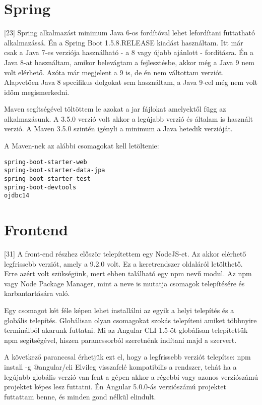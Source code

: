 




\section{Spring}

[23] Spring alkalmazást minimum Java 6-os fordítóval lehet lefordítani futtatható alkalmazássá. Én a Spring Boot 1.5.8.RELEASE kiadást használtam. Itt már csak a Java 7-es verziója használható - a 8 vagy újabb ajánlott - fordításra. Én a Java 8-at használtam, amikor belevágtam a fejlesztésbe, akkor még a Java 9 nem volt elérhető. Azóta már megjelent a 9 is, de én nem váltottam verziót. Alapvetően Java 8 specifikus dolgokat sem használtam, a Java 9-cel még nem volt időm megismerkedni.

Maven segítségével töltöttem le azokat a jar fájlokat amelyektől függ az alkalmazásunk. A 3.5.0 verzió volt akkor a legújabb verzió és általam is használt verzió. A Maven 3.5.0 szintén igényli a minimum a Java hetedik verzióját.

A Maven-nek az alábbi csomagokat kell letöltenie:
\begin{verbatim}
spring-boot-starter-web
spring-boot-starter-data-jpa
spring-boot-starter-test
spring-boot-devtools
ojdbc14
\end{verbatim}


\section{Frontend}

[31] A front-end részhez először telepítettem egy NodeJS-et. Az akkor elérhető legfrissebb verziót, amely a 9.2.0 volt. Ez a keretrendszer oldaláról letölthető. Erre azért volt szükségünk, mert ebben található egy npm nevű modul. Az npm vagy Node Package Manager, mint a neve is mutatja csomagok telepítésére és karbantartására való.

Egy csomagot két féle képen lehet installálni az egyik a helyi telepítés és a globális telepítés. Globálisan olyan csomagokat szokás telepíteni amiket többnyire terminálból akarunk futtatni.
Mi az Angular CLI 1.5-öt globálisan telepítettük npm segítségével, hiszen parancssorból szeretnénk indítani majd a szervert.

A következő paranccsal érhetjük ezt el, hogy a legfrissebb verziót telepítse: npm install -g @angular/cli
Elvileg visszafelé kompatibilis a rendszer, tehát ha a legújabb globális verzió van fent a gépen akkor a régebbi vagy azonos verziószámú projektet képes lesz futtatni. Én Angular 5.0.0-ás verziószámú projektet futtattam benne, és minden gond nélkül elindult.
